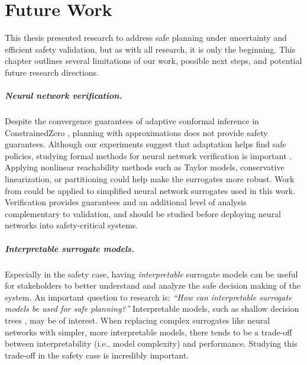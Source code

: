 \chapter{Future Work}\label{ch:future}

This thesis presented research to address safe planning under uncertainty and efficient safety validation, but as with all research, it is only the beginning.
This chapter outlines several limitations of our work, possible next steps, and potential future research directions.

\paragraph{Neural network verification.}
Despite the convergence guarantees of adaptive conformal inference in ConstrainedZero \cite{gibbs2021adaptive}, planning with approximations does not provide safety guarantees.
Although our experiments suggest that adaptation helps find safe policies, studying formal methods for neural network verification is important \cite{liu2021algorithms}.
Applying nonlinear reachability methods such as Taylor models, conservative linearization, or partitioning \cite{althoff2021set,makino2003taylor,everett2021reachability,valbook} could help make the surrogates more robust.
Work from \textcite{katz2017reluplex} could be applied to simplified neural network surrogates used in this work.
Verification provides guarantees and an additional level of analysis complementary to validation, and should be studied before deploying neural networks into safety-critical systems.

\paragraph{Interpretable surrogate models.}
Especially in the safety case, having \textit{interpretable} surrogate models \cite{bougie2023interpretable} can be useful for stakeholders to better understand and analyze the safe decision making of the system.
An important question to research is: \textit{``How can interpretable surrogate models be used for safe planning?''}
Interpretable models, such as shallow decision trees \cite{de2013decision}, may be of interest.
When replacing complex surrogates like neural networks with simpler, more interpretable models, there tends to be a trade-off between interpretability (i.e., model complexity) and performance.
Studying this trade-off in the safety case is incredibly important.

